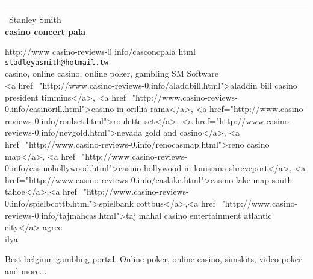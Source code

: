\documentclass{report}
\begin{document}
\begin{center}
\rule{6in}{1pt} \
{\large Stanley Smith \\
{\bf casino concert pala}}

http://www casino-reviews-0 info/casconcpala html
\\
{\tt stadleyasmith@hotmail.tw}\\
casino, online casino, online poker, gambling SM Software\\
<a href="http://www.casino-reviews-0.info/aladdbill.html">aladdin bill casino president timmins</a>, <a href="http://www.casino-reviews-0.info/casinorill.html">casino in orillia rama</a>, <a href="http://www.casino-reviews-0.info/roulset.html">roulette set</a>, <a href="http://www.casino-reviews-0.info/nevgold.html">nevada gold and casino</a>, <a href="http://www.casino-reviews-0.info/renocasmap.html">reno casino map</a>, <a href="http://www.casino-reviews-0.info/casinohollywood.html">casino hollywood in louisiana shreveport</a>, <a href="http://www.casino-reviews-0.info/caslake.html">casino lake map south tahoe</a>,<a href="http://www.casino-reviews-0.info/spielbcottb.html">spielbank cottbus</a>,<a href="http://www.casino-reviews-0.info/tajmahcas.html">taj mahal casino entertainment atlantic city</a> agree\\
	ilya\end{center}

Best belgium gambling portal. Online poker, online casino, simslots,
video poker and more...
\end{document}

